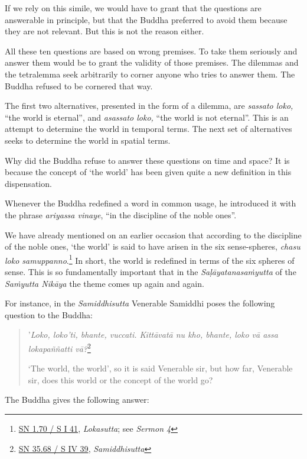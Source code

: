 If we rely on this simile, we would have to grant that the questions are answerable in principle, but that the Buddha preferred to avoid them because they are not relevant. But this is not the reason either.

All these ten questions are based on wrong premises. To take them seriously and answer them would be to grant the validity of those premises. The dilemmas and the tetralemma seek arbitrarily to corner anyone who tries to answer them. The Buddha refused to be cornered that way.

The first two alternatives, presented in the form of a dilemma, are \emph{sassato loko,} ``the world is eternal'', and \emph{asassato loko,} ``the world is not eternal''. This is an attempt to determine the world in temporal terms. The next set of alternatives seeks to determine the world in spatial terms.

Why did the Buddha refuse to answer these questions on time and space? It is because the concept of `the world' has been given quite a new definition in this dispensation.

Whenever the Buddha redefined a word in common usage, he introduced it with the phrase \emph{ariyassa vinaye}, ``in the discipline of the noble ones''.

We have already mentioned on an earlier occasion that according to the discipline of the noble ones, `the world' is said to have arisen in the six sense-spheres, \emph{chasu loko samuppanno}.\footnote{\href{https://suttacentral.net/sn1.70/pli/ms}{SN 1.70 / S I 41}, \emph{Lokasutta}; see \emph{Sermon 4}} In short, the world is redefined in terms of the six spheres of sense. This is so fundamentally important that in the \emph{Saḷāyatanasaṁyutta} of the \emph{Saṁyutta Nikāya} the theme comes up again and again.

For instance, in the \emph{Samiddhisutta} Venerable Samiddhi poses the following question to the Buddha:

\begin{quote}
'\emph{Loko, loko'ti, bhante, vuccati. Kittāvatā nu kho, bhante, loko vā assa lokapaññatti vā?}\footnote{\href{https://suttacentral.net/sn35.68/pli/ms}{SN 35.68 / S IV 39}, \emph{Samiddhisutta}}

`The world, the world', so it is said Venerable sir, but how far, Venerable sir, does this world or the concept of the world go?
\end{quote}

The Buddha gives the following answer:

